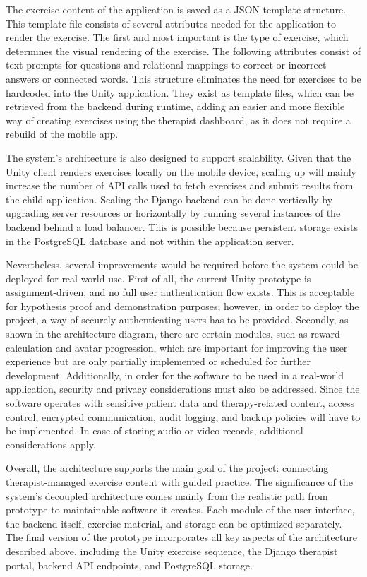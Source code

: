 The exercise content of the application is saved as a JSON template structure. This template file consists of several attributes needed for the application to render the exercise. The first and most important is the type of exercise, which determines the visual rendering of the exercise. The following attributes consist of text prompts for questions and relational mappings to correct or incorrect answers or connected words. This structure eliminates the need for exercises to be hardcoded into the Unity application. They exist as template files, which can be retrieved from the backend during runtime, adding an easier and more flexible way of creating exercises using the therapist dashboard, as it does not require a rebuild of the mobile app.

The system's architecture is also designed to support scalability. Given that the Unity client renders exercises locally on the mobile device, scaling up will mainly increase the number of API calls used to fetch exercises and submit results from the child application. Scaling the Django backend can be done vertically by upgrading server resources or horizontally by running several instances of the backend behind a load balancer. This is possible because persistent storage exists in the PostgreSQL database and not within the application server.

Nevertheless, several improvements would be required before the system could be deployed for real-world use. First of all, the current Unity prototype is assignment-driven, and no full user authentication flow exists. This is acceptable for hypothesis proof and demonstration purposes; however, in order to deploy the project, a way of securely authenticating users has to be provided. Secondly, as shown in the architecture diagram, there are certain modules, such as reward calculation and avatar progression, which are important for improving the user experience but are only partially implemented or scheduled for further development. Additionally, in order for the software to be used in a real-world application, security and privacy considerations must also be addressed. Since the software operates with sensitive patient data and therapy-related content, access control, encrypted communication, audit logging, and backup policies will have to be implemented. In case of storing audio or video records, additional considerations apply.

Overall, the architecture supports the main goal of the project: connecting therapist-managed exercise content with guided practice. The significance of the system's decoupled architecture comes mainly from the realistic path from prototype to maintainable software it creates. Each module of the user interface, the backend itself, exercise material, and storage can be optimized separately. The final version of the prototype incorporates all key aspects of the architecture described above, including the Unity exercise sequence, the Django therapist portal, backend API endpoints, and PostgreSQL storage.

